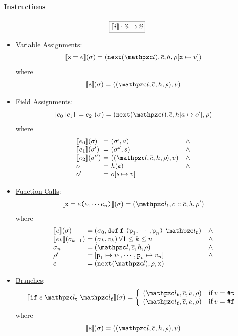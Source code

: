 \paragraph{Instructions}
\[
  \framebox{$\sem{\inst}: \stset \rightarrow \stset$}
\]
\begin{itemize}
  \item \underline{Variable Assignments}:
    \[
      \sem{\varx = \expr}(\st) =
      (\getnext(\lab), \ctxts, \heap, \env[\varx \mapsto \val])
    \]
    where
    \[
      \sem{\expr}(\st) = ((\lab, \ctxts, \heap, \env), \val)
    \]

  \item \underline{Field Assignments}:
    \[
      \sem{\expr_0 \kwsl \expr_1 \kwsr = \expr_2}(\st) =
      (\getnext(\lab), \ctxts, \heap[\addr \mapsto \obj'], \env)
    \]
    where
    \[
      \begin{array}{l@{~}c@{~}ll}
        \sem{\expr_0}(\st) &=& (\st', \addr) &\wedge\\
        \sem{\expr_1}(\st') &=& (\st'', \str) &\wedge\\
        \sem{\expr_2}(\st'') &=& ((\lab, \ctxts, \heap, \env), \val) &\wedge\\
        \obj &=& \heap(\addr) &\wedge\\
        \obj' &=& \obj[\str \mapsto \val]\\
      \end{array}
    \]

  \item \underline{Function Calls}:
    \[
      \sem{\varx = \expr \kwrl \expr_1 \cdots \expr_n \kwrr}(\st) =
      (\lab_\varf, \ctxt :: \ctxts, \heap, \env')
    \]
    where
    \[
      \begin{array}{l@{~}c@{~}ll}
        \sem{\expr}(\st) &=& (\st_0, \kwdef \; \varf \; \kwrl \varp_1, \cdots,
        \varp_n \kwrr \; \lab_\varf) &\wedge\\
        \sem{\expr_k}(\st_{k-1}) &=& (\st_k, \val_k) \; \forall 1 \leq k \leq n
        &\wedge\\
        \st_n &=& (\lab, \ctxts, \heap, \env) &\wedge\\
        \env' &=& [\varp_1 \mapsto \val_1, \cdots, \varp_n \mapsto \val_n]
        &\wedge\\
        \ctxt &=& (\getnext(\lab), \env, \varx)\\
      \end{array}
    \]

  \item \underline{Branches}:
    \[
      \sem{\kwif \; \expr \; \lab_\vart \; \lab_\varf}(\st) =
      \left\{
        \begin{array}{ll}
          (\lab_\vart, \ctxts, \heap, \env) & \text{if} \; \val = \true\\
          (\lab_\varf, \ctxts, \heap, \env) & \text{if} \; \val = \false\\
        \end{array}
      \right.
    \]
    where
    \[
      \sem{\expr}(\st) = ((\lab, \ctxts, \heap, \env), \val)
    \]


\end{itemize}
